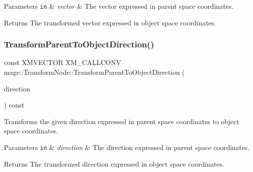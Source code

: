 \begin{DoxyParams}[1]{Parameters}
\mbox{\tt in}  & {\em vector} & The vector expressed in parent space coordinates. \\
\hline
\end{DoxyParams}
\begin{DoxyReturn}{Returns}
The transformed vector expressed in object space coordinates. 
\end{DoxyReturn}
\hypertarget{classmage_1_1_transform_node_ab7c1a1559d407f36deb342095b37e7b9}{}\label{classmage_1_1_transform_node_ab7c1a1559d407f36deb342095b37e7b9} 
\subsubsection{\texorpdfstring{Transform\+Parent\+To\+Object\+Direction()}{TransformParentToObjectDirection()}}
{\footnotesize\ttfamily const X\+M\+V\+E\+C\+T\+OR X\+M\+\_\+\+C\+A\+L\+L\+C\+O\+NV mage\+::\+Transform\+Node\+::\+Transform\+Parent\+To\+Object\+Direction (\begin{DoxyParamCaption}\item[{F\+X\+M\+V\+E\+C\+T\+OR}]{direction }\end{DoxyParamCaption}) const\hspace{0.3cm}{\ttfamily [noexcept]}}

Transforms the given direction expressed in parent space coordinates to object space coordinates.


\begin{DoxyParams}[1]{Parameters}
\mbox{\tt in}  & {\em direction} & The direction expressed in parent space coordinates. \\
\hline
\end{DoxyParams}
\begin{DoxyReturn}{Returns}
The transformed direction expressed in object space coordinates. 
\end{DoxyReturn}
\hypertarget{classmage_1_1_transform_node_afb966684b63c5e24845fa93a53802b5f}{}\label{classmage_1_1_transform_node_afb966684b63c5e24845fa93a53802b5f} 
